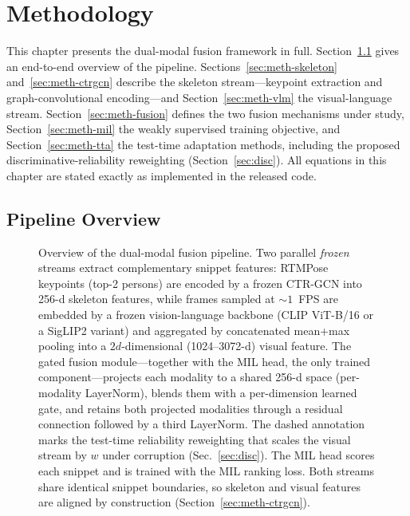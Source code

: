 \chapter{Methodology}
\label{ch:03}

This chapter presents the dual-modal fusion framework in full. Section~\ref{sec:meth-overview}
gives an end-to-end overview of the pipeline. Sections~\ref{sec:meth-skeleton}
and~\ref{sec:meth-ctrgcn} describe the skeleton stream---keypoint extraction and graph-convolutional
encoding---and Section~\ref{sec:meth-vlm} the visual-language stream. Section~\ref{sec:meth-fusion}
defines the two fusion mechanisms under study, Section~\ref{sec:meth-mil} the weakly supervised
training objective, and Section~\ref{sec:meth-tta} the test-time adaptation methods, including the
proposed discriminative-reliability reweighting (Section~\ref{sec:disc}). All equations in this
chapter are stated exactly as implemented in the released code.

\section{Pipeline Overview}
\label{sec:meth-overview}

\begin{figure}[t]
  \centering
  \resizebox{\textwidth}{!}{}
  \caption[Overview of the dual-modal gated fusion pipeline]{Overview of the dual-modal fusion pipeline. Two parallel \emph{frozen} streams extract complementary snippet features: RTMPose keypoints (top-2 persons) are encoded by a frozen CTR-GCN into 256-d skeleton features, while frames sampled at ${\sim}1$~FPS are embedded by a frozen vision-language backbone (CLIP ViT-B/16 or a SigLIP2 variant) and aggregated by concatenated mean+max pooling into a $2d$-dimensional (1024--3072-d) visual feature. The gated fusion module---together with the MIL head, the only trained component---projects each modality to a shared 256-d space (per-modality LayerNorm), blends them with a per-dimension learned gate, and retains both projected modalities through a residual connection followed by a third LayerNorm. The dashed annotation marks the test-time reliability reweighting that scales the visual stream by $w$ under corruption (Sec.~\ref{sec:disc}). The MIL head scores each snippet and is trained with the MIL ranking loss. Both streams share identical snippet boundaries, so skeleton and visual features are aligned by construction (Section~\ref{sec:meth-ctrgcn}).}
  \label{fig:architecture}
\end{figure}

